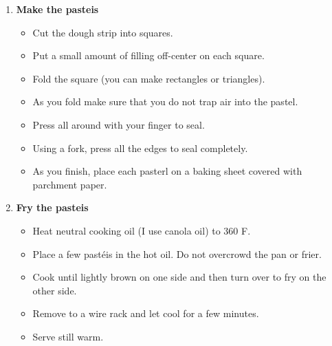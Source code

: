 \documentclass[11pt,letterpaper]{article}
\begin{document}
\begin{description}
\begin{enumerate}
\begin{itemize}
	\item If using the rolling pin, roll out the dough to a thin thickness - about 1.0 mm. 
	\item If using the pasta machine, first use a rolling pin to make the dough piece long and thin enough to fit in the machine at the thickiest setting.
	\item Pass the rolled dough through the machine.
	\item Change to the next thinner setting and pass the dough again.
	\item Repeat, stopping at the second-to-last thin setting.
	\item Lay the rolled out piece of dough on a counter top. You should have a long strip of dough that is between 3 and 4 inches wide.
	\end{itemize}
	\item {\bf Make the pasteis}
	\begin{itemize}
	\item Cut the dough strip into squares.
	\item Put a small amount of filling off-center on each square.
	\item Fold the square (you can make rectangles or triangles).
	\item As you fold make sure that you do not trap air into the pastel.
	\item Press all around with your finger to seal.
	\item Using a fork, press all the edges to seal completely.
	\item As you finish, place each pasterl on a baking sheet covered with parchment paper.
	\end{itemize}
	\item {\bf Fry the pasteis}
	\begin{itemize}
	\item Heat neutral cooking oil (I use canola oil) to 360 F.
	\item Place a few  past\'{e}is in the hot oil. Do not overcrowd the pan or frier.
	\item Cook until lightly brown on one side and then turn over to fry on the other side.
	\item Remove to a wire rack and let cool for a few minutes.
	\item Serve still warm.
	\end{itemize}
	\end{enumerate}
\end{description}
\end{document}
